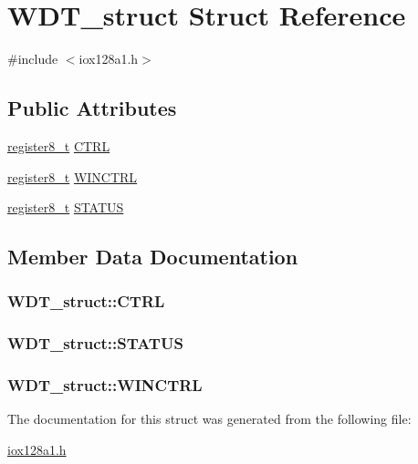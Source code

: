 \hypertarget{struct_w_d_t__struct}{
\section{WDT\_\-struct Struct Reference}
\label{struct_w_d_t__struct}
}


{\ttfamily \#include $<$iox128a1.h$>$}

\subsection*{Public Attributes}
\begin{DoxyCompactItemize}
\item 
\hyperlink{iox128a1_8h_a6a0649252b392263406882923b04a9db}{register8\_\-t} \hyperlink{struct_w_d_t__struct_aa15393a077ae1d7fa07f14e041de29e2}{CTRL}
\item 
\hyperlink{iox128a1_8h_a6a0649252b392263406882923b04a9db}{register8\_\-t} \hyperlink{struct_w_d_t__struct_a34eeb912c8787908374869ee3c6b0118}{WINCTRL}
\item 
\hyperlink{iox128a1_8h_a6a0649252b392263406882923b04a9db}{register8\_\-t} \hyperlink{struct_w_d_t__struct_a618bc5e414b66a4920146e0ce3813803}{STATUS}
\end{DoxyCompactItemize}


\subsection{Member Data Documentation}
\hypertarget{struct_w_d_t__struct_aa15393a077ae1d7fa07f14e041de29e2}{
\subsubsection[{CTRL}]{ {\bf WDT\_\-struct::CTRL}}}
\label{struct_w_d_t__struct_aa15393a077ae1d7fa07f14e041de29e2}
\hypertarget{struct_w_d_t__struct_a618bc5e414b66a4920146e0ce3813803}{
\subsubsection[{STATUS}]{ {\bf WDT\_\-struct::STATUS}}}
\label{struct_w_d_t__struct_a618bc5e414b66a4920146e0ce3813803}
\hypertarget{struct_w_d_t__struct_a34eeb912c8787908374869ee3c6b0118}{
\subsubsection[{WINCTRL}]{ {\bf WDT\_\-struct::WINCTRL}}}
\label{struct_w_d_t__struct_a34eeb912c8787908374869ee3c6b0118}


The documentation for this struct was generated from the following file:\begin{DoxyCompactItemize}
\item 
\hyperlink{iox128a1_8h}{iox128a1.h}\end{DoxyCompactItemize}
